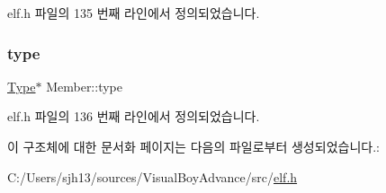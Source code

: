 elf.\+h 파일의 135 번째 라인에서 정의되었습니다.

\mbox{\label{struct_member_a7161459617d2ec472eb3830235c18d32}} 
\subsubsection{\texorpdfstring{type}{type}}
{\footnotesize\ttfamily \mbox{\hyperlink{struct_type}{Type}}$\ast$ Member\+::type}



elf.\+h 파일의 136 번째 라인에서 정의되었습니다.



이 구조체에 대한 문서화 페이지는 다음의 파일로부터 생성되었습니다.\+:\begin{DoxyCompactItemize}
\item 
C\+:/\+Users/sjh13/sources/\+Visual\+Boy\+Advance/src/\mbox{\hyperlink{elf_8h}{elf.\+h}}\end{DoxyCompactItemize}
